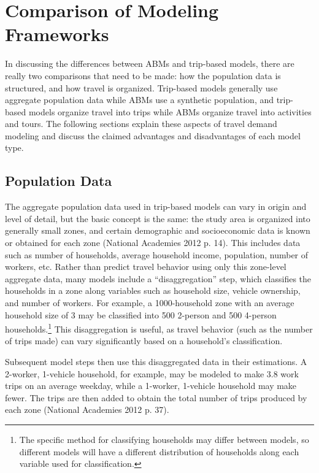 \documentclass[fancy, twoside, mastersfancy, ms]{byuthesis}
\begin{document}
\section{Comparison of Modeling
Frameworks}\label{comparison-of-modeling-frameworks}

In discussing the differences between ABMs and trip-based models, there
are really two comparisons that need to be made: how the population data
is structured, and how travel is organized. Trip-based models generally
use aggregate population data while ABMs use a synthetic population, and
trip-based models organize travel into trips while ABMs organize travel
into activities and tours. The following sections explain these aspects
of travel demand modeling and discuss the claimed advantages and
disadvantages of each model type.

\subsection{Population Data}\label{population-data}

The aggregate population data used in trip-based models can vary in
origin and level of detail, but the basic concept is the same: the study
area is organized into generally small zones, and certain demographic
and socioeconomic data is known or obtained for each zone (National
Academies 2012 p. 14). This includes data such as number of households,
average household income, population, number of workers, etc. Rather
than predict travel behavior using only this zone-level aggregate data,
many models include a ``disaggregation'' step, which classifies the
households in a zone along variables such as household size, vehicle
ownership, and number of workers. For example, a 1000-household zone
with an average household size of 3 may be classified into 500 2-person
and 500 4-person households.\footnote{The specific method for
  classifying households may differ between models, so different models
  will have a different distribution of households along each variable
  used for classification.} This disaggregation is useful, as travel
behavior (such as the number of trips made) can vary significantly based
on a household's classification.

Subsequent model steps then use this disaggregated data in their
estimations. A 2-worker, 1-vehicle household, for example, may be
modeled to make 3.8 work trips on an average weekday, while a 1-worker,
1-vehicle household may make fewer. The trips are then added to obtain
the total number of trips produced by each zone (National Academies 2012
p. 37).
\end{document}
